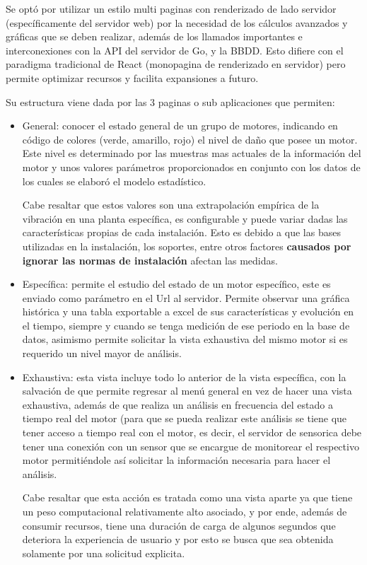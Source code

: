 Se optó por utilizar un
estilo multi paginas con renderizado de lado servidor (específicamente del
servidor web) por la necesidad de los cálculos avanzados y gráficas que
se deben realizar, además de los llamados importantes e interconexiones con la
API del servidor de Go, y la BBDD. Esto difiere con el paradigma tradicional de
React (monopagina de renderizado en servidor) pero permite optimizar recursos y
facilita expansiones a futuro.

Su estructura viene dada por las 3 paginas o sub aplicaciones que permiten:

\begin{itemize}
    \item General: conocer el estado general de un grupo de motores, indicando
        en código de colores (verde, amarillo, rojo) el nivel de daño que posee
        un motor. Este nivel es determinado por las muestras mas actuales de
        la información del motor y unos valores parámetros proporcionados en
        conjunto con los datos de los cuales se elaboró el modelo estadístico.

        Cabe resaltar que estos valores son una extrapolación empírica de la
        vibración en una planta específica, es configurable y puede variar dadas
        las características propias de cada instalación. Esto es debido a que
        las bases utilizadas en la instalación, los soportes, entre otros factores
        \textbf{causados por ignorar las normas de instalación} afectan las medidas.

    \item Específica:  permite el estudio del estado de un motor específico,
        este es enviado como parámetro en el Url al servidor. Permite observar
        una gráfica histórica y una tabla exportable a excel de sus características y
        evolución en el tiempo, siempre y cuando se tenga medición de ese periodo
        en la base de datos, asimismo permite solicitar la vista exhaustiva del
        mismo motor si es requerido un nivel mayor de análisis.

    \item Exhaustiva: esta vista incluye todo lo anterior de la vista específica,
        con la salvación de que permite regresar al menú general en vez de hacer
        una vista exhaustiva, además de que realiza un análisis en frecuencia
        del estado a tiempo real del motor (para que se pueda realizar este
        análisis se tiene que tener acceso a tiempo real con el motor, es decir,
        el servidor de sensorica debe tener una conexión con un sensor que se
        encargue de monitorear el respectivo motor permitiéndole así solicitar
        la información necesaria para hacer el análisis.

        Cabe resaltar que esta acción es tratada como una vista aparte ya que
        tiene un peso computacional relativamente alto asociado, y por ende,
        además de consumir recursos, tiene una duración de carga de algunos
        segundos que deteriora la experiencia de usuario y por esto se busca que
        sea obtenida solamente por una solicitud explicita.
\end{itemize}




